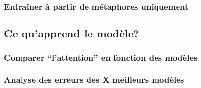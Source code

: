 
\subsubsection{Entraîner à partir de métaphores uniquement}

\subsection{Ce qu’apprend le modèle?}

\subsubsection{Comparer “l’attention” en fonction des modèles}


\subsubsection{Analyse des erreurs des X meilleurs modèles}





